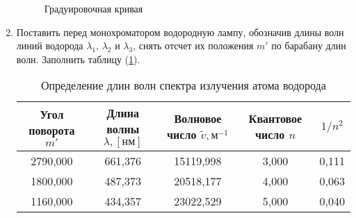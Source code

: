 \documentclass[12pt]{article}
\let\oldref\ref
\renewcommand{\ref}[1]{(\oldref{#1})}
\begin{document}
\begin{enumerate}[wide, labelwidth=!, labelindent=0pt]
\begin{table}[h!]
\begin{tabular}{|c|c|}
            \end{tabular}
        \end{table}
        \begin{figure}[h!]
            \label{graph:1}
            \caption{Градуировочная кривая}
            \centering
        \end{figure}
        \item Поставить  перед  монохроматором  водородную лампу, обозначив длины волн линий водорода $ \lambda_1 $, $ \lambda_2 $ и $ \lambda_3 $, снять отсчет их положения  $ m' $ по барабану длин волн. Заполнить таблицу \ref{tab:2}.
        \begin{table}[h!]
            \caption{Определение длин волн спектра излучения атома водорода}
            \label{tab:2}
            \centering
            \begin{tabular}{|c|c|c|c|c|}
                \hline
                Угол поворота $ m' $    & Длина волны $\lambda, [нм]$   & Волновое число $ \widetilde{v}, м^{-1} $  & Квантовое число $ n $     & $ 1/n^2 $\\
                \hline
                2790,000 & 661,376 & 15119,998 & 3,000 & 0,111\\ 
 \hline 
1800,000 & 487,373 & 20518,177 & 4,000 & 0,063\\ 
 \hline 
1160,000 & 434,357 & 23022,529 & 5,000 & 0,040\\ 
 \hline 
                

\end{tabular}
\end{table}
\end{enumerate}
\end{document}
